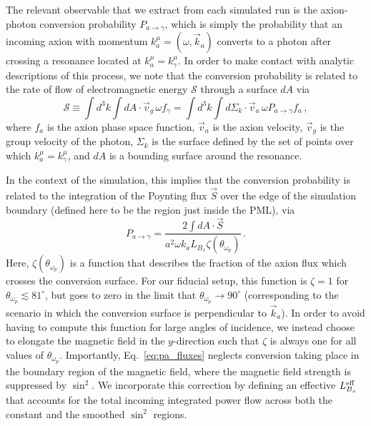 \documentclass[twocolumn,superscriptaddress,floatfix,preprintnumbers,prd,nofootinbib,aps,10pt]{revtex4-2}
\renewcommand\({\left(}
\renewcommand\){\right)}
\renewcommand\[{\left[}
\renewcommand\]{\right]}
\newcommand{\eug}[1]{{\color{blue}#1}}
\begin{document}
The relevant observable that we extract from each simulated run is the axion-photon conversion probability $P_{a \rightarrow \gamma}$, which is simply the probability that an incoming axion with momentum $k^\mu_a = (\omega, \vec{k}_a)$ converts to a photon after crossing a resonance located at $k^\mu_a = k^\mu_\gamma$. In order to make contact with analytic descriptions of this process, we note that
the conversion probability is related to the rate of flow of electromagnetic energy $\mathcal{S}$ through a surface $dA$ via~\cite{mcdonald2023axionphoton,mcdonald2023generalized}
%
\begin{equation}
   \mathcal{S} \equiv \int d^3 k \int d A \cdot \vec{v}_g \, \omega f_\gamma = \int d^3 k \int d \Sigma_k \cdot \vec{v}_a \, \omega P_{a \rightarrow \gamma} f_a \, ,
\end{equation}
%
where $f_a$ is the axion phase space function, $\vec{v}_a$ is the axion velocity, $\vec{v}_g$ is the group velocity of the photon, $\Sigma_k$ is the surface defined by the set of points over which $k^\mu_a = k^\mu_\gamma$, and $dA$ is a bounding surface around the resonance.

In the context of the simulation, this implies that the conversion probability is related to the integration of the Poynting flux $\vec{S}$ over the edge of the simulation boundary (defined here to be the region just inside the PML), via
%
\begin{equation} \label{eq:pa_fluxes}
    P_{a \rightarrow \gamma} = \frac{2 \int dA \cdot \vec{S}}{a^2 \omega k_a L_{B_x} \zeta(\theta_{\omega_p})} \, .
\end{equation}
%
Here, $\zeta(\theta_{\omega_p})$ is a function that describes the fraction of the axion flux which crosses the conversion surface. For our fiducial setup, this function is $\zeta = 1$ for $\theta_{\omega_p} \lesssim 81^\circ$, but goes to zero in the limit that $\theta_{\omega_p} \rightarrow 90^\circ$ (corresponding to the scenario in which the conversion surface is perpendicular to $\vec{k}_a$). In order to avoid having to compute this function for large angles of incidence, we instead choose to elongate the magnetic field in the $y$-direction such that $\zeta$ is always one for all values of $\theta_{\omega_p}$. Importantly, Eq.~\ref{eq:pa_fluxes} neglects conversion taking place in the boundary region of the magnetic field, where the magnetic field strength is suppressed by $\sin^2$. We incorporate this correction by defining an effective $L_{B_x}^{\rm eff}$ that accounts for the total incoming integrated power flow across both the constant and the smoothed $\sin^2$ regions. %
\end{document}
